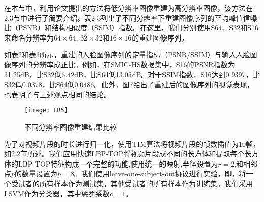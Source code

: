 在本节中，利用论文提出的方法将低分辨率图像重建为高分辨率图像，该方法在2.3节中进行了简要介绍。表2-3列出了不同分辨率下重建图像序列的平均峰值信噪比（PSNR）和结构相似度（SSIM）指数。在这里，我们分别使用S64、S32和S16来命名分辨率为$ 64 \times 64 $, $ 32 \times 32 $和$ 16 \times 16 $的重建图像序列。

\begin{table}[!htbp]
  \renewcommand\arraystretch{1.5}
  \centering
  \caption{重建图像序列的平均PSNR（dB）指标}
  \label{tab5}
\end{table}

\begin{table}[!htbp]
  \renewcommand\arraystretch{1.5}
  \centering
  \caption{重建图像序列的平均SSIM指标}
  \label{tab6}
\end{table}

如表2和表3所示，重建的人脸图像序列的定量指标（PSNR/SSIM）与输入人脸图像序列的分辨率成正比。例如，在SMIC-HS数据集中，S16的PSNR指数为31.25dB，比S32低6.42dB，比S64低13.05dB。对于SSIM指数，S16达到0.9397，比S32低0.0378，比S64低0.0486。此外，图7给出了重建后的图像序列的视觉表现，也表明了与上述观点相同的结论。

\begin{figure}[!htbp]
  \centering
  \texttt{[image: LR5]}
  \caption{不同分辨率图像重建结果比较}
  \label{fig18}
\end{figure}

为了对视频片段的时长进行归一化，使用TIM算法将视频片段的帧数插值为10帧，如2.2节所述。我们应用快速LBP-TOP将视频片段成不同的长方体和提取每个长方体的LBP-TOP特征构成一个完整的功能,使用统一的映射,半径设置为$ r=2 $,和相邻点$p$的数量设置为$ p=8 $。我们使用leave-one-subject-out协议进行实验，即，将一个受试者的所有样本作为测试集，其他受试者的所有样本作为训练集。我们采用LSVM作为分类器，其中惩罚系数$c=1$。

